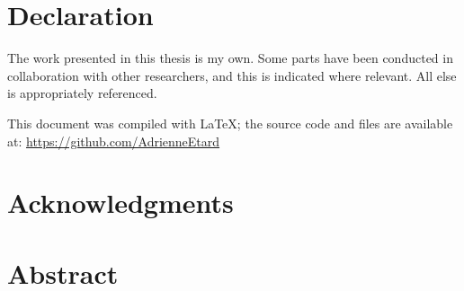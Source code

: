 \documentclass[11pt]{report}
\begin{document}



\chapter*{Declaration}
The work presented in this thesis is my own. Some parts have been conducted in collaboration
with other researchers, and this is indicated where relevant. All else is appropriately referenced.


\vspace{3cm}
This document was compiled with {\LaTeX}; the source code and files are available at: \url{https://github.com/AdrienneEtard}

\chapter*{Acknowledgments}

\chapter*{Abstract}

\end{document}
